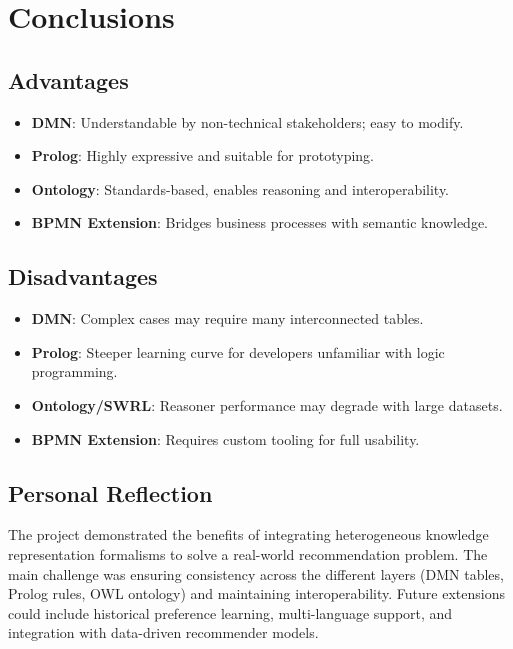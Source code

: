\documentclass[a4paper,12pt]{article}
\begin{document}
\section{Conclusions}
\subsection{Advantages}
\begin{itemize}
    \item \textbf{DMN}: Understandable by non-technical stakeholders; easy to modify.
    \item \textbf{Prolog}: Highly expressive and suitable for prototyping.
    \item \textbf{Ontology}: Standards-based, enables reasoning and interoperability.
    \item \textbf{BPMN Extension}: Bridges business processes with semantic knowledge.
\end{itemize}

\subsection{Disadvantages}
\begin{itemize}
    \item \textbf{DMN}: Complex cases may require many interconnected tables.
    \item \textbf{Prolog}: Steeper learning curve for developers unfamiliar with logic programming.
    \item \textbf{Ontology/SWRL}: Reasoner performance may degrade with large datasets.
    \item \textbf{BPMN Extension}: Requires custom tooling for full usability.
\end{itemize}

\subsection{Personal Reflection}
The project demonstrated the benefits of integrating heterogeneous knowledge representation formalisms to solve a real-world recommendation problem.  
The main challenge was ensuring consistency across the different layers (DMN tables, Prolog rules, OWL ontology) and maintaining interoperability.  
Future extensions could include historical preference learning, multi-language support, and integration with data-driven recommender models.
\end{document}
